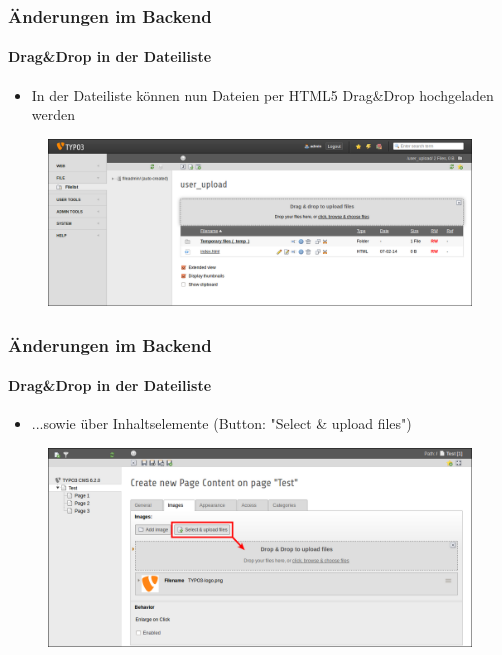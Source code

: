 
\begin{frame}[fragile]
	\frametitle{Änderungen im Backend}
	\framesubtitle{Drag\&Drop in der Dateiliste}

	\begin{itemize}
		\item In der Dateiliste können nun Dateien per HTML5 Drag\&Drop hochgeladen werden
	\end{itemize}

	\begin{figure}
		\includegraphics[width=0.95\linewidth]{Images/BackendChanges/DragDropFileUpload.png}
	\end{figure}

\end{frame}


\begin{frame}[fragile]
	\frametitle{Änderungen im Backend}
	\framesubtitle{Drag\&Drop in der Dateiliste}

	\begin{itemize}
		\item ...sowie über Inhaltselemente (Button: "Select \& upload files")

	\end{itemize}

	\begin{figure}
		\includegraphics[width=0.95\linewidth]{Images/BackendChanges/SelectAndUploadFiles.png}
	\end{figure}

\end{frame}


